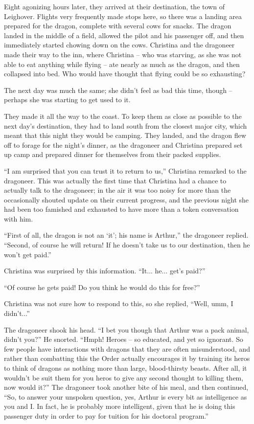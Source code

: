 \documentclass[showtrims,b6paper,draft,10pt]{memoir}
\begin{document}
Eight agonizing hours later, they arrived at their destination, the town of Leighover.  Flights very frequently made stops here, so there was a landing area prepared for the dragon, complete with several cows for snacks.  The dragon landed in the middle of a field, allowed the pilot and his passenger off, and then immediately started chowing down on the cows.  Christina and the dragoneer made their way to the inn, where Christina -- who was starving, as she was not able to eat anything while flying -- ate nearly as much as the dragon, and then collapsed into bed.  Who would have thought that flying could be so exhausting?

The next day was much the same;  she didn't feel as bad this time, though -- perhaps she was starting to get used to it.

They made it all the way to the coast.  To keep them as close as possible to the next day's destination, they had to land south from the closest major city, which meant that this night they would be camping.  They landed, and the dragon flew off to forage for the night's dinner, as the dragoneer and Christina prepared set up camp and prepared dinner for themselves from their packed supplies.

``I am surprised that you can trust it to return to us,''  Christina remarked to the dragoneer.  This was actually the first time that Christina had a chance to actually talk to the dragoneer;  in the air it was too noisy for more than the occasionally shouted update on their current progress, and the previous night she had been too famished and exhausted to have more than a token conversation with him.

``First of all, the dragon is not an `it';  his name is Arthur,'' the dragoneer replied.  ``Second, of course he will return!  If he doesn't take us to our destination, then he won't get paid.''

Christina was surprised by this information.  ``It... he... get's paid?''

``Of course he gets paid!  Do you think he would do this for free?''

Christina was not sure how to respond to this, so she replied, ``Well, umm, I didn't...''

The dragoneer shook his head.  ``I bet you though that Arthur was a pack animal, didn't you?''   He snorted.  ``Hmph!  Heroes -- so educated, and yet so ignorant.  So few people have interactions with dragons that they are often misunderstood, and rather than combatting this the Order actually encourages it by training its heros to think of dragons as nothing more than  large, blood-thirsty beasts.  After all, it wouldn't be suit them for you heros to give any second thought to killing them, now would it?''  The dragoneer took another bite of his meal, and then continued,  ``So, to answer your unspoken question, yes, Arthur is every bit as intelligence as you and I.  In fact, he is probably more intelligent, given that he is doing this passenger duty in order to pay for tuition for his doctoral program.''
\end{document}
